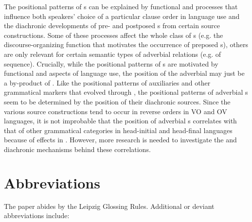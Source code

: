 \documentclass[output=paper]{langsci/langscibook}
\begin{document}
The positional patterns of s 
\label{p:diessel:preposedadverbialclauses}
can be explained by functional and  processes that influence both speakers’ choice of a particular clause order in language use and the diachronic developments of pre- and postposed s from certain source constructions. Some of these processes affect the whole class of s (e.g. the discourse-organizing function that motivates the occurrence of preposed s), others are only relevant for certain semantic types of adverbial relations (e.g.  of sequence). Crucially, while the positional patterns of s are motivated by functional and  aspects of language use, the position of the adverbial  may just be a by-product of . Like the positional patterns of auxiliaries and other grammatical markers that evolved through , the positional patterns of adverbial s seem to be determined by the position of their diachronic sources. Since the various source constructions tend to occur in reverse orders in VO and OV languages, it is not improbable that the position of adverbial s correlates with that of other grammatical categories in head-initial and head-final languages because of  effects in . However, more research is needed to investigate the  and diachronic mechanisms behind these correlations.

\section*{Abbreviations}

The paper abides by the Leipzig Glossing Rules. Additional or deviant abbreviations include:
\end{document}
